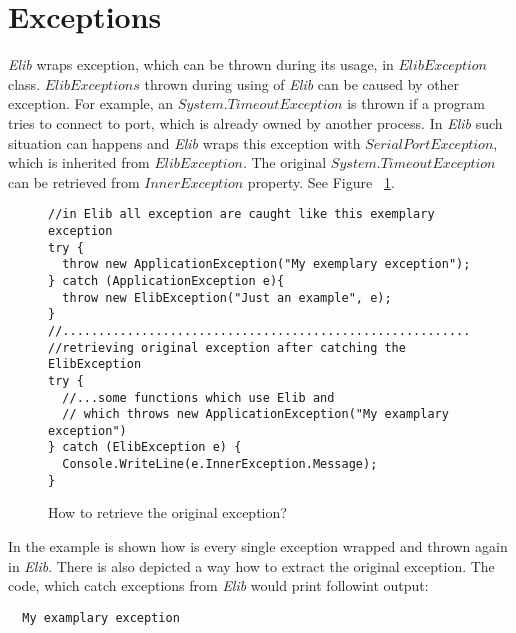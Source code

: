 \chapter*{Exceptions}
  {\it Elib} wraps exception, which can be thrown during its usage, in $ ElibException$ class.
  $ElibExceptions$ thrown during using of {\it Elib} can be caused by other exception.
  For example, an $System.TimeoutException$ is thrown if a program tries to connect to port, 
  which is already owned by another process.
  In {\it Elib} such situation can happens and {\it Elib} wraps this exception
  with $SerialPortException$, which is inherited from $ElibException$.
  The original $System.TimeoutException$ can be retrieved from $InnerException$ property.
  See Figure ~\ref{exceptionuse}.
\begin{figure}[!hbp]
\begin{lstlisting}
//in Elib all exception are caught like this exemplary exception
try {
  throw new ApplicationException("My exemplary exception");
} catch (ApplicationException e){
  throw new ElibException("Just an example", e);
}
//........................................................................
//retrieving original exception after catching the ElibException
try {
  //...some functions which use Elib and 
  // which throws new ApplicationException("My examplary exception")
} catch (ElibException e) {
  Console.WriteLine(e.InnerException.Message);
}
\end{lstlisting}
\caption{How to retrieve the original exception?}
\label{exceptionuse}
\end{figure}
  In the example is shown how is every single exception wrapped and thrown again in {\it Elib}.
  There is also depicted a way how to extract the original exception.
  The code, which catch exceptions from {\it Elib} would print followint output:
\begin{verbatim}
  My examplary exception
\end{verbatim}

